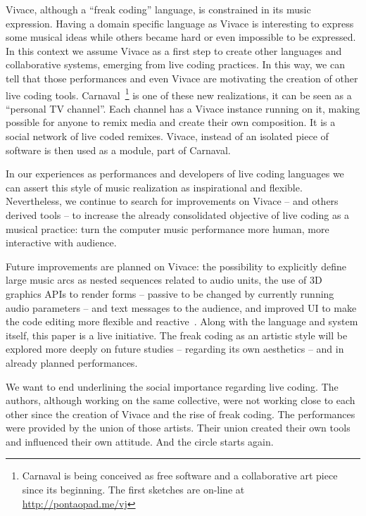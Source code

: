 \documentclass[letterpaper, 12pt]{article}
\begin{document}
Vivace, although a ``freak coding'' language, is constrained in its
music expression. Having a domain specific language as Vivace is
interesting to express some musical ideas while others became hard or
even impossible to be expressed. In this context we assume Vivace as a
first step to create other languages and collaborative systems,
emerging from live coding practices. In this way, we can tell that
those performances and even Vivace are motivating the creation of
other live coding tools. Carnaval~\footnote{Carnaval is being
  conceived as free software and a collaborative art piece since its
  beginning. The first sketches are on-line at
  \url{http://pontaopad.me/vj}} is one of these new realizations, it
can be seen as a ``personal TV channel''. Each channel has a Vivace
instance running on it, making possible for anyone to remix media and
create their own composition. It is a social network of live coded
remixes. Vivace, instead of an isolated piece of software is then used
as a module, part of Carnaval.

In our experiences as performances and developers of live coding
languages we can assert this style of music realization as
inspirational and flexible. Nevertheless, we continue to search for
improvements on Vivace -- and others derived tools -- to increase the
already consolidated objective of live coding as a musical practice:
turn the computer music performance more human, more interactive with
audience.

Future improvements are planned on Vivace: the possibility to
explicitly define large music arcs as nested sequences related to
audio units, the use of 3D graphics APIs to render forms -- passive to
be changed by currently running audio parameters -- and text messages
to the audience, and improved UI to make the code editing more
flexible and reactive~\citep*{brett}.  Along with the language and
system itself, this paper is a live initiative. The freak coding as an
artistic style will be explored more deeply on future studies --
regarding its own aesthetics -- and in already planned performances.

We want to end underlining the social importance regarding live
coding. The authors, although working on the same collective, were not
working close to each other since the creation of Vivace and the rise
of freak coding. The performances were provided by the union of those
artists. Their union created their own tools and influenced their own
attitude. And the circle starts again.



\end{document}
